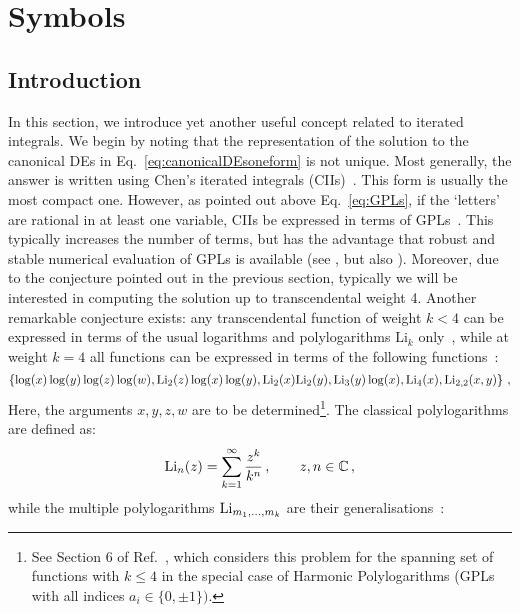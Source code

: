 \documentclass[main.tex]{subfiles}
\begin{document}
\section{Symbols} \label{sec:symbols}
\subsection{Introduction}
In this section, we introduce yet another useful concept related to iterated integrals. We begin by noting that the representation of the solution to the canonical DEs in Eq.~\ref{eq:canonicalDEsoneform} is not unique. Most generally, the answer is written using Chen's iterated integrals (CIIs)~\cite{Chen:1977oja}. This form is usually the most compact one. However, as pointed out above Eq.~\ref{eq:GPLs}, if the `letters' are rational in at least one variable, CIIs be expressed in terms of GPLs~\cite{Henn:2014qga}. This typically increases the number of terms, but has the advantage that robust and stable numerical evaluation of GPLs is available (see \cite{Bauer:2000cp, Vollinga:2004sn}, but also \cite{Panzer:2014caa}). Moreover, due to the conjecture pointed out in the previous section, typically we will be interested in computing the solution up to transcendental weight 4. Another remarkable conjecture exists: any transcendental function of weight $k < 4$ can be expressed in terms of the usual logarithms and polylogarithms $\text{Li}_k$ only~\cite{MR1265551, Goncharov:2010jf}, while at weight $k=4$ all functions can be expressed in terms of the following functions~\cite{Henn:2014qga}:
\begin{equation} \label{eq:weight4basis}
    \left\{\log(x)\log(y)\log(z)\log(w), \text{Li}_2(z) \log(x) \log(y), \text{Li}_2(x)\text{Li}_2(y), \text{Li}_3(y) \log (x), \text{Li}_4(x), \text{Li}_{2,2}(x, y) \right\}\,,
\end{equation}
Here, the arguments $x,y,z,w$ are to be determined\footnote{See Section 6 of Ref.~\cite{Duhr:2011zq}, which considers this problem for the spanning set of functions with $k\le4$ in the special case of Harmonic Polylogarithms (GPLs with all indices $a_i\in\{0,\pm1\})$.}.
The classical polylogarithms are defined as:
\begin{equation} \label{eq:Lidefinition}
    \text{Li}_n(z) = \sum_{k=1}^\infty \frac{z^k}{k^n}\,, \qquad z, n \in \mathbb{C}\,,
\end{equation}
while the multiple polylogarithms $\text{Li}_{m_1, \ldots, m_k}$ are their generalisations~\cite{2011arXiv1105.2076G, Duhr:2019tlz}:
\end{document}
